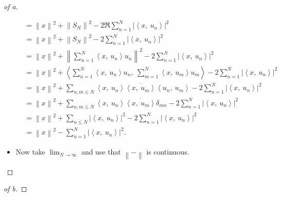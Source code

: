 \begin{solution}
\begin{proof}[of a]
\begin{itemize}
\begin{align*}
  &= {\left\lVert {x} \right\rVert}^2 + {\left\lVert {S_N} \right\rVert}^2 - 2\Re \sum_{n=1}^N {\left\lvert {{\left\langle {x},~{u_n} \right\rangle} } \right\rvert}^2 \\
  &= {\left\lVert {x} \right\rVert}^2 + {\left\lVert {S_N} \right\rVert}^2 - 2\sum_{n=1}^N {\left\lvert {{\left\langle {x},~{u_n} \right\rangle} } \right\rvert}^2 \\
  &= {\left\lVert {x} \right\rVert}^2 + {\left\lVert {\sum_{n=1}^N {\left\langle {x},~{u_n} \right\rangle} u_n} \right\rVert}^2 - 2\sum_{n=1}^N {\left\lvert {{\left\langle {x},~{u_n} \right\rangle} } \right\rvert}^2 \\
  &= {\left\lVert {x} \right\rVert}^2 + 
  {\left\langle {\sum_{n=1}^N {\left\langle {x},~{u_n} \right\rangle} u_n},~{\sum_{m=1}^N {\left\langle {x},~{u_m} \right\rangle} u_m} \right\rangle} 
  - 2\sum_{n=1}^N {\left\lvert {{\left\langle {x},~{u_n} \right\rangle} } \right\rvert}^2 \\
  &= {\left\lVert {x} \right\rVert}^2 + 
  \sum_{n, m \leq N}{\left\langle {x},~{u_n} \right\rangle} {\overline{{{\left\langle {x},~{u_m} \right\rangle} }}}{\left\langle {u_n},~{u_m} \right\rangle}
  - 2\sum_{n=1}^N {\left\lvert {{\left\langle {x},~{u_n} \right\rangle} } \right\rvert}^2 \\
  &= {\left\lVert {x} \right\rVert}^2 + \sum_{n, m\leq N} {\left\langle {x},~{u_n} \right\rangle} {\overline{{{\left\langle {x},~{u_m} \right\rangle}}}} \delta_{mn}
  - 2\sum_{n=1}^N {\left\lvert {{\left\langle {x},~{u_n} \right\rangle} } \right\rvert}^2 \\
  &= {\left\lVert {x} \right\rVert}^2 + \sum_{n\leq N} {\left\lvert {{\left\langle {x},~{u_n} \right\rangle}} \right\rvert}^2
  - 2\sum_{n=1}^N {\left\lvert {{\left\langle {x},~{u_n} \right\rangle} } \right\rvert}^2 \\
  &= {\left\lVert {x} \right\rVert}^2 
  - \sum_{n=1}^N {\left\lvert {{\left\langle {x},~{u_n} \right\rangle} } \right\rvert}^2 
  .\end{align*}
\item
  Now take \(\lim_{N\to\infty}\) and use that
  \({\left\lVert {{-}} \right\rVert}\) is continuous.
\end{itemize}

\end{proof}

\begin{proof}[of b]

\envlist


\end{proof}
\end{solution}
